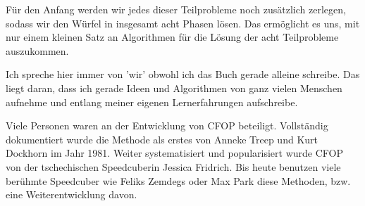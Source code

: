 Für den Anfang werden wir jedes dieser Teilprobleme noch zusätzlich zerlegen, sodass wir den Würfel in insgesamt acht Phasen lösen.
Das ermöglicht es uns, mit nur einem kleinen Satz an Algorithmen für die Lösung der acht Teilprobleme auszukommen.

Ich spreche hier immer von 'wir' obwohl ich das Buch gerade alleine schreibe.
Das liegt daran, dass ich gerade Ideen und Algorithmen von ganz vielen Menschen aufnehme und entlang meiner eigenen Lernerfahrungen aufschreibe.

Viele Personen waren an der Entwicklung von CFOP beteiligt.
Vollständig dokumentiert wurde die Methode als erstes von Anneke Treep und Kurt Dockhorn im Jahr 1981.
Weiter systematisiert und popularisiert wurde CFOP von der tschechischen Speedcuberin Jessica Fridrich.
Bis heute benutzen viele berühmte Speedcuber wie Feliks Zemdegs oder Max Park diese Methoden, bzw. eine Weiterentwicklung davon.
